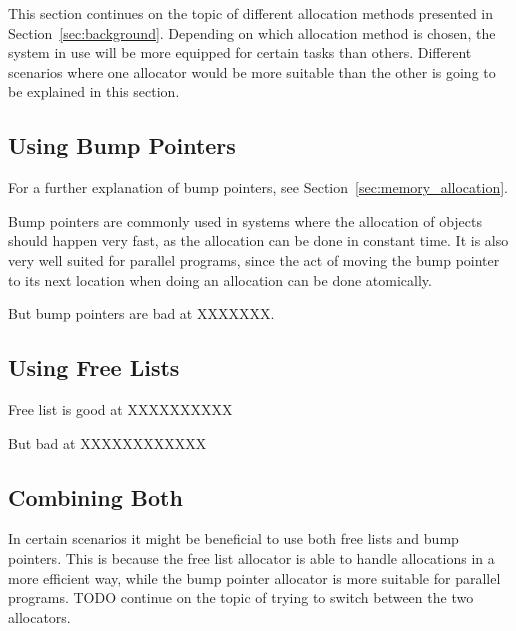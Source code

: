 

This section continues on the topic of different allocation methods presented in Section~\ref{sec:background}. Depending on which allocation method is chosen, the system in use will be more equipped for certain tasks than others. Different scenarios where one allocator would be more suitable than the other is going to be explained in this section.

\subsection{Using Bump Pointers}
For a further explanation of bump pointers, see Section~\ref{sec:memory_allocation}.

Bump pointers are commonly used in systems where the allocation of objects should happen very fast, as the allocation can be done in constant time. It is also very well suited for parallel programs, since the act of moving the bump pointer to its next location when doing an allocation can be done atomically. 

But bump pointers are bad at XXXXXXX.

\subsection{Using Free Lists}
Free list is good at XXXXXXXXXX

But bad at XXXXXXXXXXXX

\subsection{Combining Both}
In certain scenarios it might be beneficial to use both free lists and bump pointers. This is because the free list allocator is able to handle allocations in a more efficient way, while the bump pointer allocator is more suitable for parallel programs. TODO continue on the topic of trying to switch between the two allocators.